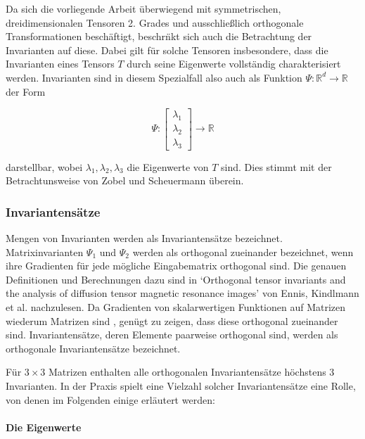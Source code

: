 \documentclass[a4paper,fontsize=12pt,toc=bib,halfparskip]{scrartcl}
\begin{document}
Da sich die vorliegende Arbeit \"uberwiegend mit symmetrischen, dreidimensionalen Tensoren 2. Grades und ausschlie{\ss}lich orthogonale Transformationen besch\"aftigt, beschr\"nkt sich auch die Betrachtung der Invarianten auf diese. Dabei gilt f\"ur solche Tensoren insbesondere, dass die Invarianten eines Tensors $T$ durch seine Eigenwerte vollst\"andig charakterisiert werden. Invarianten sind in diesem Spezialfall also auch als Funktion $\Psi: \mathbb{R}^d \rightarrow \mathbb{R}$ der Form

\begin{equation}
	\Psi:
	\begin{bmatrix}
	\lambda_1\\
	\lambda_2\\
	\lambda_3
	\end{bmatrix}
	\rightarrow \mathbb{R}
\end{equation}

darstellbar, wobei $\lambda_1, \lambda_2, \lambda_3$ die Eigenwerte von $T$ sind. Dies stimmt mit der Betrachtunsweise von Zobel und Scheuermann \cite{zobel2017extremal} \"uberein.

\subsubsection{Invariantens\"atze} 
Mengen von Invarianten werden als Invariantens\"atze bezeichnet.
Matrixinvarianten $\Psi_1$ und $\Psi_2$ werden als orthogonal zueinander bezeichnet, wenn ihre Gradienten f\"ur jede m\"ogliche Eingabematrix orthogonal sind. Die genauen Definitionen und Berechnungen dazu sind in `Orthogonal tensor invariants and the analysis of diffusion tensor magnetic resonance images' von Ennis, Kindlmann et al. \cite{ennis2006orthogonal} nachzulesen. Da Gradienten von skalarwertigen Funktionen auf Matrizen wiederum Matrizen sind \cite[S.~137]{ennis2006orthogonal}, gen\"ugt zu zeigen, dass diese orthogonal zueinander sind. Invariantens\"atze, deren Elemente paarweise orthogonal sind, werden als orthogonale Invariantens\"atze bezeichnet.

F\"ur $3\times 3$ Matrizen enthalten alle orthogonalen Invariantens\"atze h\"ochstens 3 Invarianten. In der Praxis spielt eine Vielzahl solcher Invariantens\"atze eine Rolle, von denen im Folgenden einige erl\"autert werden:

\paragraph{Die Eigenwerte}
\end{document}

